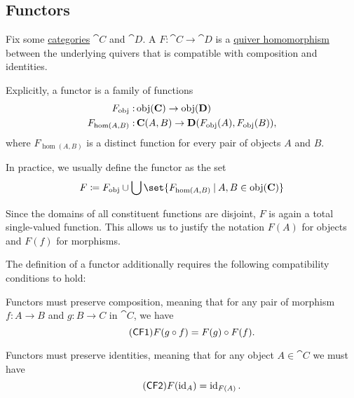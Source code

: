 \subsection{Functors}\label{subsec:functors}

\begin{definition}\label{def:functor}
  Fix some \hyperref[def:category]{categories} \( \cat{C} \) and \( \cat{D} \). A  \( F: \cat{C} \to \cat{D} \) is a \hyperref[def:theory_of_graphs/quiver_homomorphism]{quiver homomorphism} between the underlying quivers that is compatible with composition and identities.

  Explicitly, a functor is a family of functions
  \begin{equation}\label{eq:def:functor_as_family_of_function}
    \begin{aligned}
      F_{\operatorname{obj}}:       &\operatorname{obj}(\operatorname{\mathbf{C}}) \to \operatorname{obj}(\operatorname{\mathbf{D}}) \\
      F_{\hom(A, B)}: &\operatorname{\mathbf{C}}(A, B) \to \operatorname{\mathbf{D}}(F_{\operatorname{obj}}(A), F_{\operatorname{obj}}(B)),
    \end{aligned}
  \end{equation}
  where \( F_{\hom(A, B)} \) is a distinct function for every pair of objects \( A \) and \( B \).

  In practice, we usually define the functor as the set
  \begin{equation}\label{eq:def:functor_as_single_function}
    F \coloneqq F_{\obj} \cup \bigcup\set{ F_{\hom(A, B)} \given A, B \in \obj(\cat{C}) }
  \end{equation}

  Since the domains of all constituent functions are disjoint, \( F \) is again a total single-valued function. This allows us to justify the notation \( F(A) \) for objects and \( F(f) \) for morphisms.

  The definition of a functor additionally requires the following compatibility conditions to hold:
  \begin{thmenum}[series=def:category]
     Functors must preserve composition, meaning that for any pair of morphism \( f: A \to B \) and \( g: B \to C \) in \( \cat{C} \), we have
    \begin{equation}\label{eq:def:category/CF1}\tag{\logic{CF1}}
      F(g \bincirc f) = F(g) \bincirc F(f).
    \end{equation}

     Functors must preserve identities, meaning that for any object \( A \in \cat{C} \) we must have
    \begin{equation}\label{eq:def:category/CF2}\tag{\logic{CF2}}
      F(\id_A) = \id_{F(A)}.
    \end{equation}
  \end{thmenum}
\end{definition}
